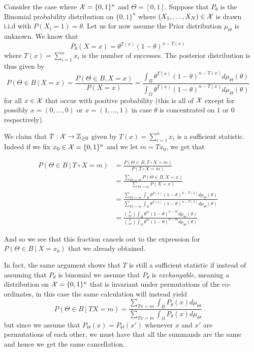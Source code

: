 \documentclass[twoside, a4paper, 10pt]{amsart}
\begin{document}
\begin{eg} \label{eg: bernoulli bayes setup} Consider the case where $\mathcal{X} = \{0,1\}^n$ and $\Theta = [0,1]$. Suppose that $P_{\theta}$ is the Binomial probability distribution on $\{0,1\}^n$ where $(X_1, \ldots, X_N) \in \mathcal{X}$ is drawn i.i.d with $P(X_i = 1) = \theta.$ Let us for now assume the Prior distribution $\mu_{\Theta}$ is unknown. We know that $$P_{\theta}(X = x) =   \theta^{T(x)}(1-\theta)^{n - T(x)} $$ where $T(x) = \sum_{i=1}^n x_i$ is the number of successes. The posterior distribution is thus given by $$P(\Theta \in B ~|~ X=x) = \frac{P(\Theta \in B, X=x)}{P(X=x)} = \frac{ \int_B \theta^{T(x)}(1-\theta)^{n - T(x)} d \mu_{\Theta}(\theta)}{\int_{\Omega} \theta^{T(x)}(1-\theta)^{n - T(x)} d \mu_{\Theta}(\theta)}$$ for all $x \in \mathcal{X}$ that occur with positive probability (this is all of $\mathcal{X}$ except for possibly $x = (0,\ldots, 0)$ or $x = (1, \ldots, 1)$ in case $\theta$ is concentrated on $1$ or $0$ respectively).


We claim that $ T:\mathcal{X} \to \mathbb{Z}_{\geq 0}$ given by $T(x) = \sum_{i=1}^n x_i$ is a sufficient statistic. Indeed if we fix $x_0 \in \mathcal{X} = \{0,1\}^n$ and we let $m=Tx_0$, we get that  

\begin{align*} P( \Theta \in B ~|~ T \circ X = m) &= \frac{P( \Theta \in B, T\circ X = m)}{P(T\circ X = m)} 
\\ &= \frac{\sum_{Tx = m} P(\Theta \in B, X = x) }{\sum_{Tx = m}P(X = x)} 
\\ &= \frac{ \sum_{Tx = m} \int_B \theta^{T(x)}(1-\theta)^{n - T(x)} d \mu_{\Theta}(\theta)}{ \sum_{Tx = m} \int_{\Omega} \theta^{T(x)}(1-\theta)^{n - T(x)} d \mu_{\Theta}(\theta)}
\\ &= \frac{ \binom{n}{m} \int_B \theta^{m}(1-\theta)^{n - m} d \mu_{\Theta}(\theta)}{ \binom{n}{m} \int_{\Omega} \theta^{m}(1-\theta)^{n - m} d \mu_{\Theta}(\theta)} \end{align*}

And so we see that this fraction cancels out to the expression for $P(\Theta \in B ~|~ X=x_0)$ that we already obtained.

In fact, the same argument shows that $T$ is still a sufficient statistic if instead of assuming that $P_{\theta}$ is binomial we assume that $P_{\theta}$ is \textit{exchangable}, meaning a distribution on $\mathcal{X} = \{0,1\}^n$ that is invariant under permutations of the co-ordinates, in this case the same calculation will instead yield $$P( \Theta \in B ~|~ TX = m) = \frac{\sum_{Tx = m} \int_B P_{\theta}(x) d\mu_{\Theta} }{\sum_{Tx = m}  \int_{\Omega} P_{\theta}(x) d\mu_{\Theta} }$$ but since we assume that $P_{\Theta}(x) = P_{\Theta}(x')$ whenever $x$ and $x'$ are permutations of each other, we must have that all the summands are the same and hence we get the same cancellation.
\end{eg}
\end{document}
